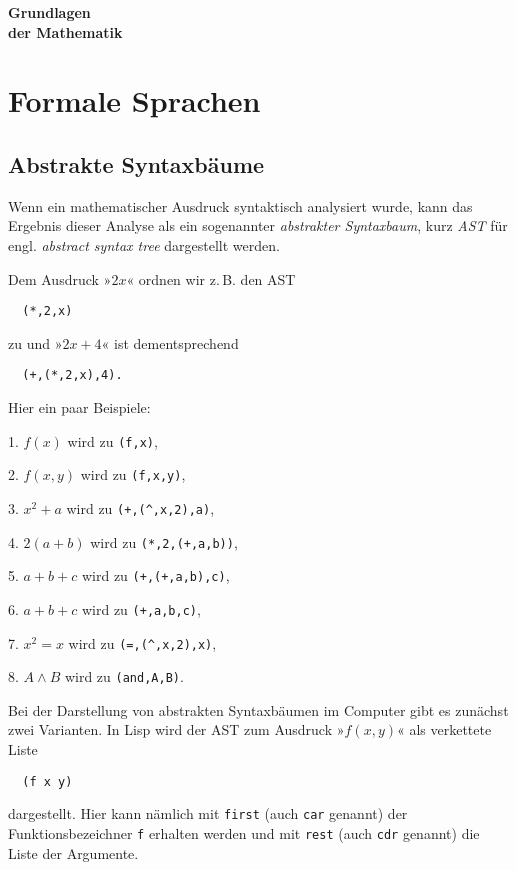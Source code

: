 \documentclass[a4paper,11pt,fleqn,twocolumn,twoside]{article}
\numberwithin{equation}{section}
\begin{document}
\thispagestyle{empty}

\begin{huge}
\noindent
\textbf{Grundlagen\\
der Mathematik}
\par
\end{huge}

\tableofcontents

\section{Formale Sprachen}
\subsection{Abstrakte Syntaxbäume}

Wenn ein mathematischer Ausdruck syntaktisch analysiert
wurde, kann das Ergebnis dieser Analyse als ein sogenannter
\emph{abstrakter Syntaxbaum}, kurz \emph{AST} für engl.
\emph{abstract syntax tree} dargestellt werden.

Dem Ausdruck »$2x$« ordnen wir z.\,B. den AST
\begin{verbatim}
  (*,2,x)
\end{verbatim}
zu und »$2x+4$« ist dementsprechend
\begin{verbatim}
  (+,(*,2,x),4).
\end{verbatim}
Hier ein paar Beispiele:

1. $f(x)$ wird zu \verb|(f,x)|,

2. $f(x,y)$ wird zu \verb|(f,x,y)|,

3. $x^2+a$ wird zu \verb|(+,(^,x,2),a)|,

4. $2(a+b)$ wird zu \verb|(*,2,(+,a,b))|,

5. $a+b+c$ wird zu \verb|(+,(+,a,b),c)|,

6. $a+b+c$ wird zu \verb|(+,a,b,c)|,

7. $x^2=x$ wird zu \verb|(=,(^,x,2),x)|,

8. $A\land B$ wird zu \verb|(and,A,B)|.

\noindent
Bei der Darstellung von abstrakten Syntaxbäumen im Computer gibt
es zunächst zwei Varianten. In Lisp wird der AST zum Ausdruck »$f(x,y)$«
als verkettete Liste
\begin{verbatim}
  (f x y)
\end{verbatim}
dargestellt. Hier kann nämlich mit \texttt{first}
(auch \texttt{car} genannt) der Funktionsbezeichner \texttt{f}
erhalten werden und mit \texttt{rest} (auch \texttt{cdr} genannt)
die Liste der Argumente.
\end{document}

